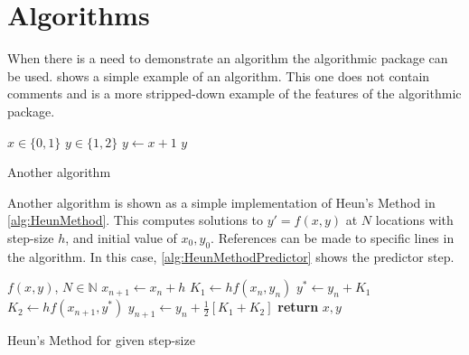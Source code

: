 \section{Algorithms} \label{sec:Algorithms}
    When there is a need to demonstrate an algorithm the algorithmic package can be used.
     shows a simple example of an algorithm.
    This one does not contain comments and is a more stripped-down example of the features of the algorithmic package.
    \begin{algorithm}
        \begin{algorithmic}
            \Require $x \in \{0,1\}$
            \Ensure $y \in \{1,2\}$
            \State $y \gets x+1$
            \State \Return $y$
        \end{algorithmic}
        \caption{Another algorithm}
        \label{alg:SecondAlgorithm}
    \end{algorithm}

    Another algorithm is shown as a simple implementation of Heun's Method in \cref{alg:HeunMethod}.
    This computes solutions to $y'=f\left(x,y\right)$ at $N$ locations with step-size $h$, and initial value of $x_0, y_0$.
    References can be made to specific lines in the algorithm.
    In this case, \cref{alg:HeunMethodPredictor} shows the predictor step.
    \begin{algorithm}
        \begin{algorithmic}
            \Require $f\left(x,y\right)$, $N\in\mathbb{N}$
                    \State $x_{n+1}\gets x_n+h$
                    \State $K_1\gets hf\left(x_n, y_n\right)$
                    \State $y^*\gets y_n+K_1$ \label{alg:HeunMethodPredictor}
                    \State $K_2\gets hf\left(x_{n+1}, y^*\right)$
                    \State $y_{n+1}\gets y_n+\frac{1}{2}\left[K_1+K_2\right]$
                \EndFor
                \State \textbf{return} $x,y$ 
            \EndProcedure
        \end{algorithmic}
        \caption{Heun's Method for given step-size}
        \label{alg:HeunMethod}
    \end{algorithm}

